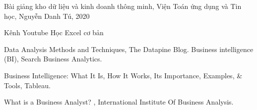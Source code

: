 \newpage
\begin{thebibliography}{}\rm
{}

 Bài giảng kho dữ liệu và kinh doanh thông minh, Viện Toán ứng dụng và Tin học, Nguyễn Danh Tú, 2020

 Kênh Youtube Học Excel cơ bản

 Data Analysis Methods and Techniques, The Datapine Blog.
Business intelligence (BI), Search Business Analytics.

 Business Intelligence: What It Is, How It Works, Its Importance, Examples, \& Tools, Tableau.

 What is a Business Analyst? , International Institute Of Business Analysis.

\end{thebibliography}

\newpage
\thispagestyle{empty}

